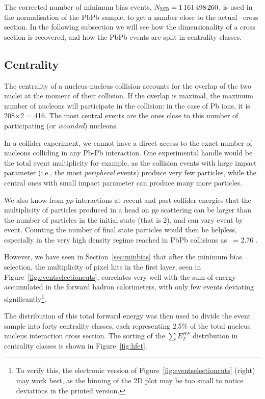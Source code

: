 The corrected number of minimum bias events, $N_{\rm MB} =
1\,161\,498\,260$, is used in the normalisation of the PbPb sample, to
get a number close to the actual \PgU\ cross section. In the following
subsection we will see how the dimensionality of a cross section is
recovered, and how the PbPb events are split in centrality classes.
%
%


\subsection{Centrality}
\label{sec:centrality}


The centrality of a nucleus-nucleus collision accounts for the overlap
of the two nuclei at the moment of their collision. If the overlap is
maximal, the maximum number of nucleons will participate in the
collision: in the case of Pb ions, it is 208$\times$2 = 416. The most
central events are the ones close to this number of participating (or
\textit{wounded}) nucleons.


In a collider experiment, we cannot have a direct access to the exact
number of nucleons colliding in any Pb-Pb interaction. One
experimental handle would be the total event multiplicity for example,
as the collision events with large impact parameter (i.e., the most
\textit{peripheral} events) produce very few
particles, while the central ones with small impact parameter can
produce many more particles.


We also know from $pp$ interactions at recent and past collider energies that
the multiplicity of particles produced in a head on $pp$ scattering
can be larger than the number of particles in the initial state (that
is 2), and can vary event by event. Counting the number of
final state particles would then be helpless, especially in the very high
density regime reached in PbPb collisions as \snn\ = 2.76 \TeV.

However, we have seen in Section~\ref{sec:minbias} that after the
minimum bias selection, the multiplicity of pixel hits in the first layer, seen in
Figure~\ref{fig:eventselectioncuts}, correlates very well with
the sum of energy accumulated in the forward hadron calorimeters, with
only few events deviating significantly\footnote{To verify this, the
  electronic version of Figure~\ref{fig:eventselectioncuts} (right) may work
  best, as the binning of the 2D plot may be too small to notice
  deviations in the printed version.}.


The distribution of this total forward energy was then used to divide
the event sample into forty centrality classes, each representing
2.5\% of the total nucleus nucleus interaction cross section. The
sorting of the $\sum{}E_{T}^{HF}$ distribution in centrality classes is
shown in Figure~\ref{fig:hfet}.



